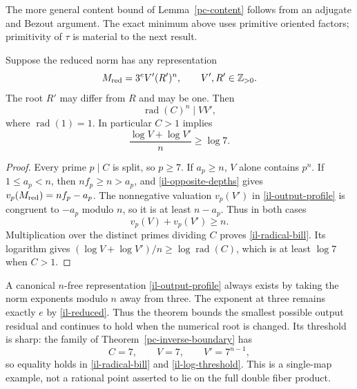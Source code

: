 The more general content bound of Lemma~\ref{pc-content} follows
from an adjugate and Bezout argument. The exact minimum above uses
primitive oriented factors; primitivity of $\tau$ is material to
the next result.

\begin{theorem}\label{il-residual-bill}
Suppose the reduced norm has any representation
\begin{equation}\label{il-output-profile}
 M_{\rm red}=3^eV'(R')^n,\qquad V',R'\in\mathbb Z_{>0}.
\end{equation}
The root $R'$ may differ from $R$ and may be one. Then
\begin{equation}\label{il-radical-bill}
 \operatorname{rad}(C)^n\mid VV',
\end{equation}
where $\operatorname{rad}(1)=1$. In particular $C>1$ implies
\begin{equation}\label{il-log-threshold}
 \frac{\log V+\log V'}n\ge\log7.
\end{equation}
\end{theorem}
\begin{proof}
Every prime $p\mid C$ is split, so $p\ge7$. If $a_p\ge n$,
$V$ alone contains $p^n$. If $1\le a_p<n$, then
$nf_p\ge n>a_p$, and \eqref{il-opposite-depths} gives
$v_p(M_{\rm red})=nf_p-a_p$. The nonnegative valuation $v_p(V')$
in \eqref{il-output-profile} is congruent to $-a_p$ modulo $n$,
so it is at least $n-a_p$. Thus in both cases
\[
 v_p(V)+v_p(V')\ge n.
\]
Multiplication over the distinct primes dividing $C$ proves
\eqref{il-radical-bill}. Its logarithm gives
$(\log V+\log V')/n\ge\log\operatorname{rad}(C)$, which is
at least $\log7$ when $C>1$.
\end{proof}

A canonical $n$-free representation \eqref{il-output-profile}
always exists by taking the norm exponents modulo $n$ away from
three. The exponent at three remains exactly $e$ by
\eqref{il-reduced}. Thus the theorem bounds the smallest possible
output residual and continues to hold when the numerical root is
changed. Its threshold is sharp: the family of
Theorem~\ref{pc-inverse-boundary} has
\[
 C=7,\qquad V=7,\qquad V'=7^{n-1},
\]
so equality holds in \eqref{il-radical-bill} and
\eqref{il-log-threshold}. This is a single-map example, not a
rational point asserted to lie on the full double fiber product.

